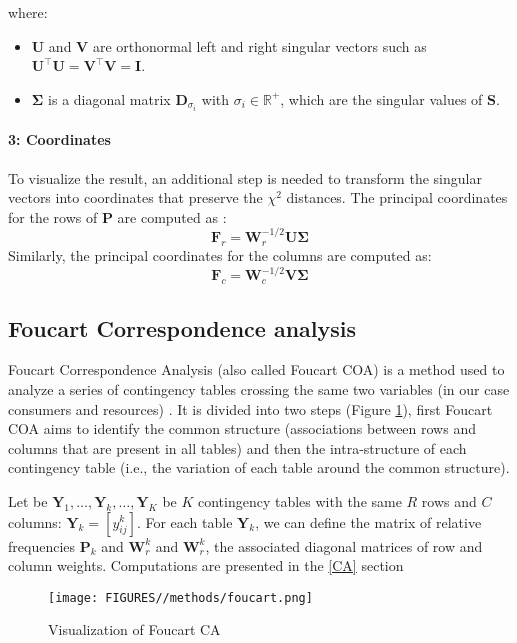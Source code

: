 where:
\begin{itemize}
    \item $\mathbf{U}$ and $\mathbf{V}$ are orthonormal left and right singular vectors such as $\mathbf{U}^\intercal\mathbf{U} = \mathbf{V}^\intercal\mathbf{V} = \mathbf{I}$.
    \item  $\mathbf{\Sigma}$ is a diagonal matrix $\mathbf{D}_{\sigma_i}$ with $\sigma_i \in \mathbb{R}^+$, which are the singular values of $\mathbf{S}$.
\end{itemize}


\paragraph{3: Coordinates}

To visualize the result, an additional step is needed to transform the singular vectors into coordinates that preserve the $\chi^2$ distances. The principal coordinates for the rows of $\mathbf{P}$ are computed as :
$$
    \mathbf{F}_r = \mathbf{W}_r^{-1/2} \mathbf{U} \mathbf{\Sigma}
$$
Similarly, the principal coordinates for the columns are computed as:
$$
    \mathbf{F}_c = \mathbf{W}_c^{-1/2} \mathbf{V} \mathbf{\Sigma}
$$ 


\subsection{Foucart Correspondence analysis}

Foucart Correspondence Analysis (also called Foucart COA) is a method used to analyze a series of contingency tables  crossing the same two variables (in our case consumers and resources) \citep{pavoine_new_2007}.
It is divided into two steps (Figure \ref{fig:foucart}), first Foucart COA aims to identify the common structure (associations between rows and columns that are present in all tables) and then the intra-structure of each contingency table (i.e., the variation of each table around the common structure).

Let be $\mathbf{Y}_1, \ldots, \mathbf{Y}_k, \ldots, \mathbf{Y}_K$ be $K$ contingency tables with the same $R$ rows and $C$ columns: $\mathbf{Y}_k = [y_{ij}^k]$. 
For each table $\mathbf{Y}_k$, we can define the matrix of relative frequencies $\mathbf{P}_k$ and $\mathbf{W}_r^k$ and $\mathbf{W}_r^k$, the associated diagonal matrices of row and column weights. Computations are presented in the \ref{CA} section 

\begin{figure}[h]
    \centering
    \texttt{[image: FIGURES//methods/foucart.png]}
    \caption{Visualization of Foucart CA}
    \label{fig:foucart}
\end{figure}

